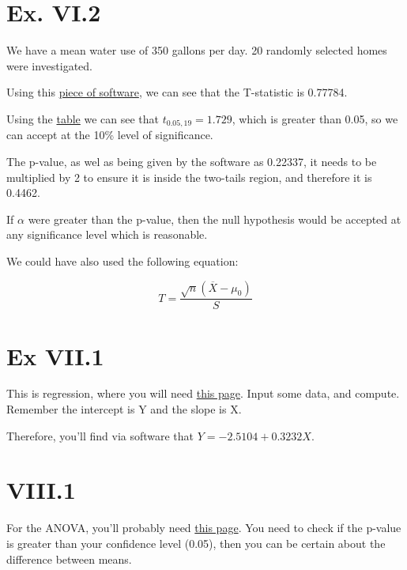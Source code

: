\documentclass[titlepage, letterpaper]{article}
\begin{document}

\section{Ex. VI.2} %
\label{sec:ex_vi_2}

We have a mean water use of 350 gallons per day.
20 randomly selected homes were investigated.

Using this \href{https://home.ubalt.edu/ntsbarsh/Business-stat/otherapplets/MeanTest.htm}{piece of software}, we can see that the T-statistic is 0.77784.

Using the \href{http://www.sjsu.edu/faculty/gerstman/StatPrimer/t-table.pdf}{table} we can see that $t_{0.05,19} = 1.729$, which is greater than 0.05, so we can accept at the 10\% level of significance.

The p-value, as wel as being given by the software as 0.22337, it needs to be multiplied by 2 to ensure it is inside the two-tails region, and therefore it is 0.4462.

If $\alpha$ were greater than the p-value, then the null hypothesis would be accepted at any significance level which is reasonable.

We could have also used the following equation:

\begin{equation}
    T = \frac{\sqrt{n}(\overline{X} - \mu_0)}{S}
\end{equation}

\section{Ex VII.1} %
\label{sec:ex_vii_1}

This is regression, where you will need \href{https://home.ubalt.edu/ntsbarsh/Business-stat/otherapplets/Regression.htm}{this page}.
Input some data, and compute.
Remember the intercept is Y and the slope is X.

Therefore, you'll find via software that $Y = -2.5104 +0.3232X$.

\section{VIII.1} %
\label{sec:viii_1}
For the ANOVA, you'll probably need \href{https://home.ubalt.edu/ntsbarsh/Business-stat/otherapplets/ANOVA.htm}{this page}.
You need to check if the p-value is greater than your confidence level (0.05), then you can be certain about the difference between means.
\end{document}
